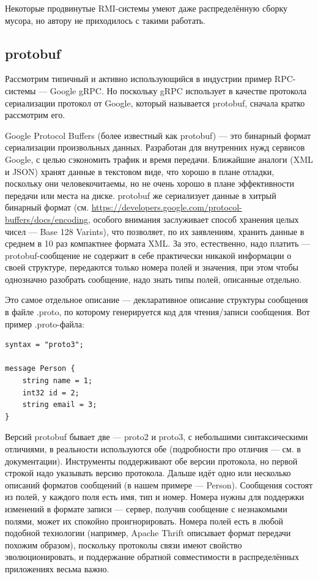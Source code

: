 \documentclass[a5paper]{article}
\begin{document}
Некоторые продвинутые RMI-системы умеют даже распределённую сборку мусора, но автору не приходилось с такими работать.

\subsection{protobuf}

Рассмотрим типичный и активно использующийся в индустрии пример RPC-системы --- Google gRPC. Но поскольку gRPC использует в качестве протокола сериализации протокол от Google, который называется protobuf, сначала кратко рассмотрим его.

Google Protocol Buffers (более известный как protobuf) --- это бинарный формат сериализации произвольных данных. Разработан для внутренних нужд сервисов Google, с целью сэкономить трафик и время передачи. Ближайшие аналоги (XML и JSON) хранят данные в текстовом виде, что хорошо в плане отладки, поскольку они человекочитаемы, но не очень хорошо в плане эффективности передачи или места на диске. protobuf же сериализует данные в хитрый бинарный формат (см. \url{https://developers.google.com/protocol-buffers/docs/encoding}, особого внимания заслуживает способ хранения целых чисел --- Base 128 Varints), что позволяет, по их заявлениям, хранить данные в среднем в 10 раз компактнее формата XML. За это, естественно, надо платить --- protobuf-сообщение не содержит в себе практически никакой информации о своей структуре, передаются только номера полей и значения, при этом чтобы однозначно разобрать сообщение, надо знать типы полей, описанные отдельно.

Это самое отдельное описание --- декларативное описание структуры сообщения в файле .proto, по которому генерируется код для чтения/записи сообщения. Вот пример .proto-файла:

\begin{verbatim}
syntax = "proto3";

message Person {
    string name = 1;
    int32 id = 2;
    string email = 3;
}
\end{verbatim}

Версий protobuf бывает две --- proto2 и proto3, с небольшими синтаксическими отличиями, в реальности используются обе (подробности про отличия --- см. в документации). Инструменты поддерживают обе версии протокола, но первой строкой надо указывать версию протокола. Дальше идёт одно или несколько описаний форматов сообщений (в нашем примере --- Person). Сообщения состоят из полей, у каждого поля есть имя, тип и номер. Номера нужны для поддержки изменений в формате записи --- сервер, получив сообщение с незнакомыми полями, может их спокойно проигнорировать. Номера полей есть в любой подобной технологии (например, Apache Thrift описывает формат передачи похожим образом), поскольку протоколы связи имеют свойство эволюционировать, и поддержание обратной совместимости в распределённых приложениях весьма важно.
\end{document}
